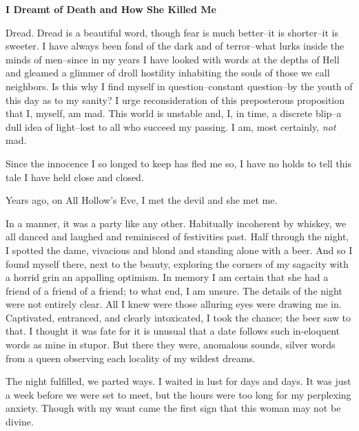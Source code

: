\documentclass{article}
\begin{document}


\begin{center}
\large\textbf{I Dreamt of Death and How She Killed Me}
\end{center}


\noindent
Dread.
Dread is a beautiful word,
though fear is much better--it is shorter--it is sweeter.
I have always been fond of the dark and of terror--what
lurks inside the minds of men--since in my years
I have looked with words at the depths of Hell
and gleamed a glimmer of droll hostility
inhabiting the souls of those we call neighbors.
Is this why I find myself in question--constant question--by
the youth of this day as to my sanity?
I urge reconsideration of this preposterous proposition that
I, myself, am mad.
This world is unstable and, I, in time, a discrete blip--a
dull idea of light--lost to all who succeed my passing.
I am, most certainly, \textit{not} mad.
\VV


\noindent
Since the innocence I so longed to keep has fled me so,
I have no holds to tell this tale I have held close and closed.
\VV


\noindent
Years ago, on All Hollow's Eve,
I met the devil and she met me.
\VV


\noindent
In a manner, it was a party like any other.
Habitually incoherent by whiskey,
we all danced and laughed and reminisced of festivities past.
Half through the night, I spotted the dame,
vivacious and blond and standing alone with a beer.
And so I found myself there, next to the beauty,
exploring the corners of my sagacity with a horrid
grin an appalling optimism.
In memory I am certain that she had a friend of
a friend of a friend; to what end, I am unsure.
The details of the night were not entirely clear.
All I knew were those alluring eyes were drawing me in.
Captivated, entranced, and clearly intoxicated,
I took the chance; the beer saw to that.
I thought it was fate for it is unusual
that a date follows such in-eloquent words
as mine in stupor.
But there they were, anomalous sounds,
silver words from a queen observing each
locality of my wildest dreams.


The night fulfilled, we parted ways.
I waited in lust for days and days.
It was just a week before we were set to meet,
but the hours were too long for my perplexing anxiety.
Though with my want came the first sign that this woman may not be divine.
\end{document}
